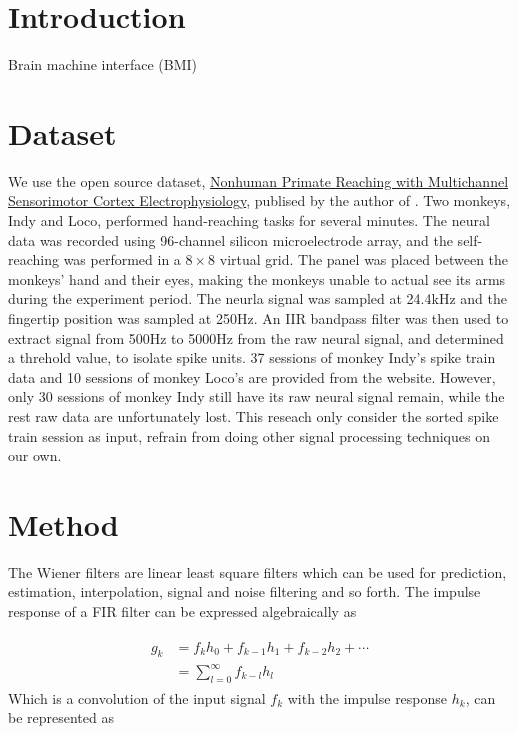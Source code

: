 \documentclass[8pt,a4paper]{article}
\begin{document}
\begin{multicols}{2}

\section*{Introduction}

Brain machine interface (BMI) 

\section*{Dataset}

We use the open source dataset, \href{https://zenodo.org/record/583331#.XWirEigzZPb}{Nonhuman Primate Reaching with Multichannel Sensorimotor Cortex Electrophysiology}, 
publised by the author of \cite{makin2018}. Two monkeys, Indy and Loco, performed hand-reaching tasks for several minutes. 
The neural data was recorded using 96-channel silicon microelectrode array, and the self-reaching was performed in a  $8 \times 8$ virtual grid. 
The panel was placed between the monkeys' hand and their eyes, making the monkeys unable to actual see its arms during the experiment period. 
The neurla signal was sampled at 24.4kHz and the fingertip position was sampled at 250Hz. 
An IIR bandpass filter was then used to extract signal from 500Hz to 5000Hz from the raw neural signal, and determined a threhold value, to isolate spike units. 
37 sessions of monkey Indy's spike train data and 10 sessions of monkey Loco's are provided from the website.  
However, only 30 sessions of monkey Indy still have its raw neural signal remain, while the rest raw data are unfortunately lost. 
This reseach only consider the sorted spike train session as input, refrain from doing other signal processing techniques on our own.

\section*{Method}

The Wiener filters are linear least square filters which can be used for prediction, estimation, interpolation, signal and noise filtering and so forth.\cite{widrow1987}
The impulse response of a FIR filter can be expressed algebraically as 

\begin{align}
  \begin{split}
  g_{k} &= f_{k}h_{0} + f_{k-1}h_{1} + f_{k-2}h_{2} + \cdots \\
        &= \sum_{l=0}^{\infty} f_{k-l}h_{l}
  \end{split}
\end{align}
Which is a convolution of the input signal $f_{k}$ with the impulse response $h_{k}$, can be represented as


\end{multicols}
\end{document}
